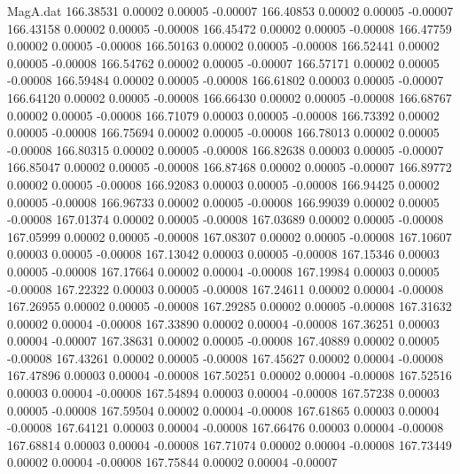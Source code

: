 \begin{filecontents}{MagA.dat}
 166.38531    0.00002    0.00005   -0.00007
 166.40853    0.00002    0.00005   -0.00007
 166.43158    0.00002    0.00005   -0.00008
 166.45472    0.00002    0.00005   -0.00008
 166.47759    0.00002    0.00005   -0.00008
 166.50163    0.00002    0.00005   -0.00008
 166.52441    0.00002    0.00005   -0.00008
 166.54762    0.00002    0.00005   -0.00007
 166.57171    0.00002    0.00005   -0.00008
 166.59484    0.00002    0.00005   -0.00008
 166.61802    0.00003    0.00005   -0.00007
 166.64120    0.00002    0.00005   -0.00008
 166.66430    0.00002    0.00005   -0.00008
 166.68767    0.00002    0.00005   -0.00008
 166.71079    0.00003    0.00005   -0.00008
 166.73392    0.00002    0.00005   -0.00008
 166.75694    0.00002    0.00005   -0.00008
 166.78013    0.00002    0.00005   -0.00008
 166.80315    0.00002    0.00005   -0.00008
 166.82638    0.00003    0.00005   -0.00007
 166.85047    0.00002    0.00005   -0.00008
 166.87468    0.00002    0.00005   -0.00007
 166.89772    0.00002    0.00005   -0.00008
 166.92083    0.00003    0.00005   -0.00008
 166.94425    0.00002    0.00005   -0.00008
 166.96733    0.00002    0.00005   -0.00008
 166.99039    0.00002    0.00005   -0.00008
 167.01374    0.00002    0.00005   -0.00008
 167.03689    0.00002    0.00005   -0.00008
 167.05999    0.00002    0.00005   -0.00008
 167.08307    0.00002    0.00005   -0.00008
 167.10607    0.00003    0.00005   -0.00008
 167.13042    0.00003    0.00005   -0.00008
 167.15346    0.00003    0.00005   -0.00008
 167.17664    0.00002    0.00004   -0.00008
 167.19984    0.00003    0.00005   -0.00008
 167.22322    0.00003    0.00005   -0.00008
 167.24611    0.00002    0.00004   -0.00008
 167.26955    0.00002    0.00005   -0.00008
 167.29285    0.00002    0.00005   -0.00008
 167.31632    0.00002    0.00004   -0.00008
 167.33890    0.00002    0.00004   -0.00008
 167.36251    0.00003    0.00004   -0.00007
 167.38631    0.00002    0.00005   -0.00008
 167.40889    0.00002    0.00005   -0.00008
 167.43261    0.00002    0.00005   -0.00008
 167.45627    0.00002    0.00004   -0.00008
 167.47896    0.00003    0.00004   -0.00008
 167.50251    0.00002    0.00004   -0.00008
 167.52516    0.00003    0.00004   -0.00008
 167.54894    0.00003    0.00004   -0.00008
 167.57238    0.00003    0.00005   -0.00008
 167.59504    0.00002    0.00004   -0.00008
 167.61865    0.00003    0.00004   -0.00008
 167.64121    0.00003    0.00004   -0.00008
 167.66476    0.00003    0.00004   -0.00008
 167.68814    0.00003    0.00004   -0.00008
 167.71074    0.00002    0.00004   -0.00008
 167.73449    0.00002    0.00004   -0.00008
 167.75844    0.00002    0.00004   -0.00007

\end{filecontents}
